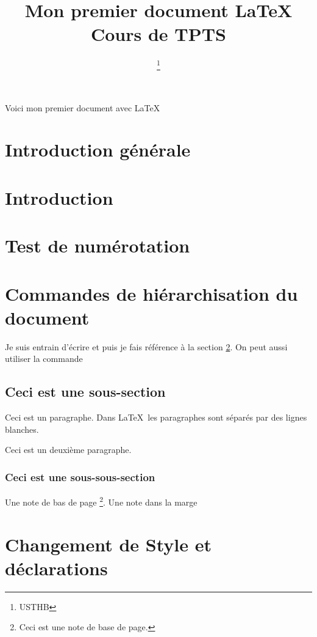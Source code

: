 \documentclass[a4paper,11pt]{article}
\title{Mon premier document \LaTeX \\ Cours de TPTS}
\author{\nompropre{J. Messamah} \and \nompropre{Mazri} \thanks{USTHB}}
\date{}
\begin{document}
\maketitle

\tableofcontents

Voici mon premier document avec \LaTeX

\section*{Introduction générale}

\section{Introduction}


\section{Test de numérotation}
\label{section/referenceTest}

\section{Commandes de hiérarchisation du document}

Je suis entrain d'écrire et puis je fais référence à la section \ref{section/referenceTest}. On peut aussi utiliser la commande \pageref{section/referenceTest}

\subsection{Ceci est une sous-section}

Ceci est un paragraphe. Dans \LaTeX\ les paragraphes sont séparés par des lignes blanches.

Ceci est un deuxième paragraphe.

\subsubsection{Ceci est une sous-sous-section}

Une note de bas de page \footnote{Ceci est une note de base de page.}.
Une note dans la marge 

\section{Changement de Style et déclarations}
\end{document}
